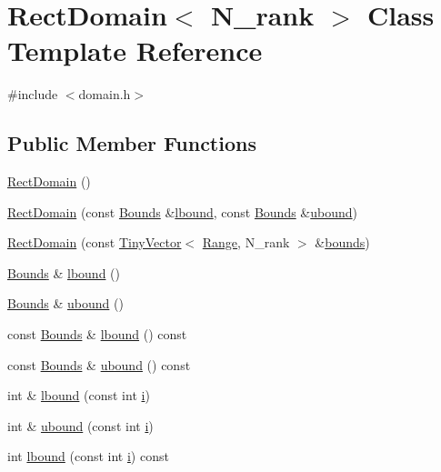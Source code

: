 \hypertarget{classRectDomain}{}\section{Rect\+Domain$<$ N\+\_\+rank $>$ Class Template Reference}
\label{classRectDomain}


{\ttfamily \#include $<$domain.\+h$>$}

\subsection*{Public Member Functions}
\begin{DoxyCompactItemize}
\item 
\hyperlink{classRectDomain_ad07f88993368670d1afe2d230ad1cea3}{Rect\+Domain} ()
\item 
\hyperlink{classRectDomain_a04fec7c9d7e63de4fa467681d1b472ee}{Rect\+Domain} (const \hyperlink{classTinyVector}{Bounds} \&\hyperlink{classRectDomain_a3f8557a0f7c8832a491156e05bba0c6b}{lbound}, const \hyperlink{classTinyVector}{Bounds} \&\hyperlink{classRectDomain_af0a679e1133fb082136b3e437674c9f2}{ubound})
\item 
\hyperlink{classRectDomain_adee8e6e270be7456d007819b87dd0967}{Rect\+Domain} (const \hyperlink{classTinyVector}{Tiny\+Vector}$<$ \hyperlink{classRange}{Range}, N\+\_\+rank $>$ \&\hyperlink{structbounds}{bounds})
\item 
\hyperlink{classTinyVector}{Bounds} \& \hyperlink{classRectDomain_a3f8557a0f7c8832a491156e05bba0c6b}{lbound} ()
\item 
\hyperlink{classTinyVector}{Bounds} \& \hyperlink{classRectDomain_af0a679e1133fb082136b3e437674c9f2}{ubound} ()
\item 
const \hyperlink{classTinyVector}{Bounds} \& \hyperlink{classRectDomain_ab1b75caf8fd4d77ffff7616258893e06}{lbound} () const 
\item 
const \hyperlink{classTinyVector}{Bounds} \& \hyperlink{classRectDomain_aa2b91068daf4d29648ff5d99881391b2}{ubound} () const 
\item 
int \& \hyperlink{classRectDomain_a4c06636dc59bce973025e938ff4318b3}{lbound} (const int \hyperlink{indexexpr_8h_aabd77643995707c185e95c8cb2782c81}{i})
\item 
int \& \hyperlink{classRectDomain_aabfb32c996df9195334fbed1e2be8633}{ubound} (const int \hyperlink{indexexpr_8h_aabd77643995707c185e95c8cb2782c81}{i})
\item 
int \hyperlink{classRectDomain_a7ca2e309849fb897b35bf5e64e657504}{lbound} (const int \hyperlink{indexexpr_8h_aabd77643995707c185e95c8cb2782c81}{i}) const 

\end{DoxyCompactItemize}
